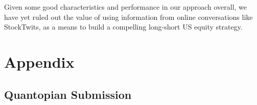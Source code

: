 \documentclass[11,]{article}
\begin{document}
Given some good characteristics and performance in our approach overall,
we have yet ruled out the value of using information from online
conversations like StockTwits, as a means to build a compelling
long-short US equity strategy.

\newpage

\hypertarget{appendix}{%
\section{Appendix}\label{appendix}}

\hypertarget{quantopian-submission}{%
\subsection{Quantopian Submission}\label{quantopian-submission}}
\end{document}
